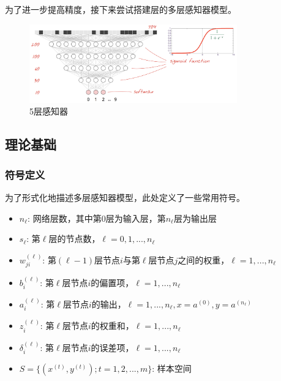 \begin{content}

为了进一步提高精度，接下来尝试搭建层的多层感知器模型。

\begin{figure}[H]
\centering
\includegraphics[width=0.8\textwidth]{figures/mnist-5-layer.png}
\caption{5层感知器}
 \label{fig:mnist-5-layer}
\end{figure}

\subsection{理论基础}

\subsubsection{符号定义}

为了形式化地描述多层感知器模型，此处定义了一些常用符号。

\begin{itemize}
   \item \alert{$ {n_{\ell}} $}: 网络层数，其中第$0$层为输入层，第$n_{\ell}$层为输出层
   \item \alert{$ {s_{\ell}} $}: 第$\ell$层的节点数，$ \ell = 0, 1, ..., n_{\ell} $
   \item \alert{$ w_{ji}^{(\ell)} $}: 第$(\ell-1)$层节点$i$与第$\ell$层节点$j$之间的权重，$ \ell = 1, ..., n_{\ell} $
   \item \alert{$ b_i^{(\ell)} $}: 第$\ell$层节点$i$的偏置项，$ \ell = 1, ..., n_{\ell} $
   \item \alert{$ a_i^{(\ell)} $}: 第$\ell$层节点$i$的输出，$ \ell = 1, ..., n_{\ell}, x = a^{(0)}, y = a^{(n_{\ell})} $
   \item \alert{$ z_i^{(\ell)} $}: 第$\ell$层节点$i$的权重和，$ \ell = 1, ..., n_{\ell} $
   \item \alert{$ \delta _i^{(\ell)} $}: 第$\ell$层节点$i$的误差项，$ \ell = 1, ..., n_{\ell} $
   \item \alert{$ S = \{ ({x^{(t)}},{y^{(t)}});t = 1,2,...,m\} $}: 样本空间
 \end{itemize}


\end{content}
